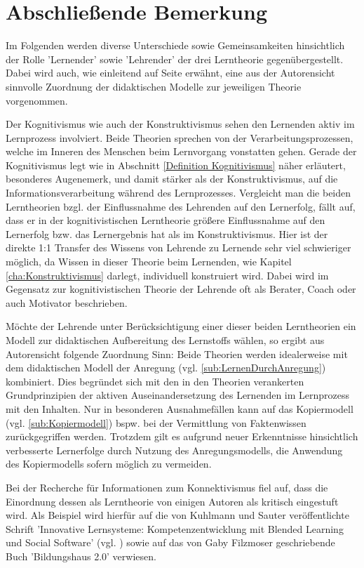 \chapter{Abschließende Bemerkung}
Im Folgenden werden diverse Unterschiede sowie Gemeinsamkeiten hinsichtlich der Rolle 'Lernender' sowie 'Lehrender' der drei Lerntheorie gegenübergestellt. Dabei wird auch, wie einleitend auf Seite \pageref{cha:Einleitung} erwähnt, eine aus der Autorensicht sinnvolle Zuordnung der didaktischen Modelle zur jeweiligen Theorie vorgenommen. 

Der Kognitivismus wie auch der Konstruktivismus sehen den Lernenden aktiv im Lernprozess involviert. Beide Theorien sprechen von der Verarbeitungsprozessen, welche im Inneren des Menschen beim Lernvorgang vonstatten gehen. Gerade der Kognitivismus legt wie in Abschnitt \ref{Definition Kognitivismus} näher erläutert, besonderes Augenemerk, und damit stärker als der Konstruktivismus, auf die Informationsverarbeitung während des Lernprozesses. Vergleicht man die beiden Lerntheorien bzgl. der Einflussnahme des Lehrenden auf den Lernerfolg, fällt auf, dass er in der kognitivistischen Lerntheorie größere Einflussnahme auf den Lernerfolg bzw. das Lernergebnis hat als im Konstruktivismus. Hier ist der direkte 1:1 Transfer des Wissens von Lehrende zu Lernende sehr viel schwieriger möglich, da Wissen in dieser Theorie beim Lernenden, wie Kapitel \ref{cha:Konstruktivismus} darlegt, individuell konstruiert wird. Dabei wird im Gegensatz zur kognitivistischen Theorie der Lehrende oft als Berater, Coach oder auch Motivator beschrieben. \cite[S. 30ff.]{Bohm.2006}

Möchte der Lehrende unter Berücksichtigung einer dieser beiden Lerntheorien ein Modell zur didaktischen Aufbereitung des Lernstoffs wählen, so ergibt aus Autorensicht folgende Zuordnung Sinn: Beide Theorien werden idealerweise mit dem didaktischen Modell der Anregung (vgl. \ref{sub:LernenDurchAnregung}) kombiniert. Dies begründet sich mit den in den Theorien verankerten Grundprinzipien der aktiven Auseinandersetzung des Lernenden im Lernprozess mit den Inhalten. Nur in besonderen Ausnahmefällen kann auf das Kopiermodell (vgl. \ref{sub:Kopiermodell}) bspw. bei der Vermittlung von Faktenwissen zurückgegriffen werden. Trotzdem gilt es aufgrund neuer Erkenntnisse hinsichtlich verbesserte Lernerfolge durch Nutzung des Anregungsmodells, die Anwendung des Kopiermodells sofern möglich zu vermeiden.

Bei der Recherche für Informationen zum Konnektivismus fiel auf, dass die Einordnung dessen als Lerntheorie von einigen Autoren als kritisch eingestuft wird. Als Beispiel wird hierfür auf die von Kuhlmann und Sauter veröffentlichte Schrift 'Innovative Lernsysteme: Kompetenzentwicklung mit Blended Learning und Social Software' (vgl. \cite{Kuhlmann.2008}) sowie auf das von Gaby Filzmoser geschriebende Buch 'Bildungshaus 2.0' verwiesen.

